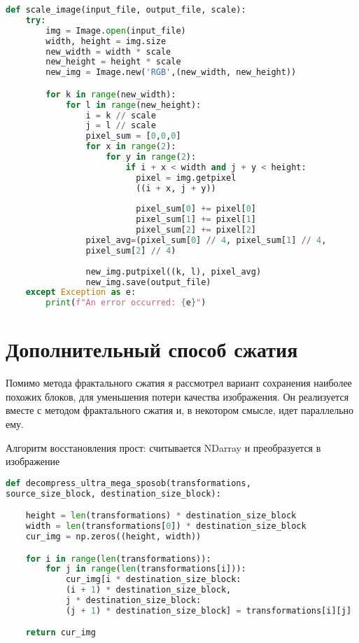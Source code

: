 \documentclass{article}
\begin{document}
\begin{lstlisting}[language=Python]
def scale_image(input_file, output_file, scale):
	try:
		img = Image.open(input_file)
		width, height = img.size
		new_width = width * scale
		new_height = height * scale
		new_img = Image.new('RGB',(new_width, new_height))

		for k in range(new_width):
			for l in range(new_height):
				i = k // scale
				j = l // scale
				pixel_sum = [0,0,0]
				for x in range(2):
					for y in range(2):
						if i + x < width and j + y < height:
						  pixel = img.getpixel
						  ((i + x, j + y))
							
						  pixel_sum[0] += pixel[0]
						  pixel_sum[1] += pixel[1]
						  pixel_sum[2] += pixel[2]
				pixel_avg=(pixel_sum[0] // 4, pixel_sum[1] // 4, 
				pixel_sum[2] // 4)
				
				new_img.putpixel((k, l), pixel_avg)
				new_img.save(output_file)
	except Exception as e:
		print(f"An error occurred: {e}")
\end{lstlisting}
\vspace{1em}

\section{Дополнительный способ сжатия}

Помимо метода фрактального сжатия я рассмотрел вариант сохранения наиболее похожих блоков, для уменьшения потери качества изображения. Он реализуется вместе с методом фрактального сжатия и, в некотором смысле, идет параллельно ему.

Алгоритм восстановления прост: считывается NDarray и преобразуется в изображение

\begin{lstlisting}[language=Python]
def decompress_ultra_mega_sposob(transformations, 
source_size_block, destination_size_block):

	height = len(transformations) * destination_size_block
	width = len(transformations[0]) * destination_size_block
	cur_img = np.zeros((height, width))

	for i in range(len(transformations)):
		for j in range(len(transformations[i])):
			cur_img[i * destination_size_block:
			(i + 1) * destination_size_block,
			j * destination_size_block:
			(j + 1) * destination_size_block] = transformations[i][j]

	return cur_img
\end{lstlisting}
\vspace{1em}
\end{document}
